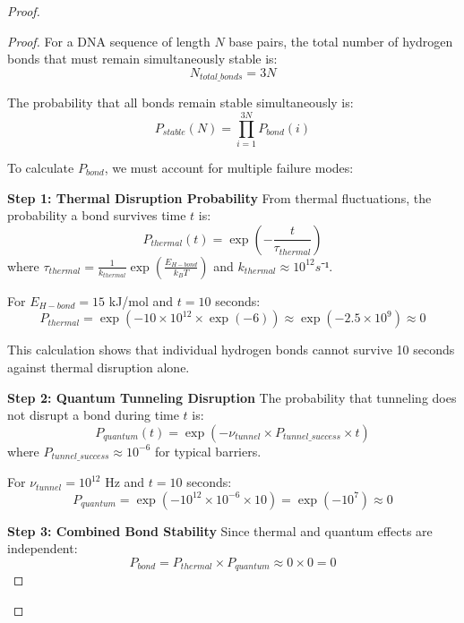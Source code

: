 \documentclass[12pt,a4paper]{article}
\begin{document}
\begin{proof}
\begin{proof}
For a DNA sequence of length $N$ base pairs, the total number of hydrogen bonds that must remain simultaneously stable is:
\begin{equation}
N_{total\_bonds} = 3N
\end{equation}

The probability that all bonds remain stable simultaneously is:
\begin{equation}
P_{stable}(N) = \prod_{i=1}^{3N} P_{bond}(i)
\end{equation}

To calculate $P_{bond}$, we must account for multiple failure modes:

\textbf{Step 1: Thermal Disruption Probability}
From thermal fluctuations, the probability a bond survives time $t$ is:
\begin{equation}
P_{thermal}(t) = \exp\left(-\frac{t}{\tau_{thermal}}\right)
\end{equation}
where $\tau_{thermal} = \frac{1}{k_{thermal}} \exp\left(\frac{E_{H-bond}}{k_BT}\right)$ and $k_{thermal} \approx 10^{12} s⁻¹.$

For $E_{H-bond} = 15$ kJ/mol and $t = 10$ seconds:
\begin{equation}
P_{thermal} = \exp\left(-10 \times 10^{12} \times \exp(-6)\right) \approx \exp(-2.5 \times 10^9) \approx 0
\end{equation}

This calculation shows that individual hydrogen bonds cannot survive 10 seconds against thermal disruption alone.

\textbf{Step 2: Quantum Tunneling Disruption}
The probability that tunneling does not disrupt a bond during time $t$ is:
\begin{equation}
P_{quantum}(t) = \exp(-\nu_{tunnel} \times P_{tunnel\_success} \times t)
\end{equation}
where $P_{tunnel\_success} \approx 10^{-6}$ for typical barriers.

For $\nu_{tunnel} = 10^{12}$ Hz and $t = 10$ seconds:
\begin{equation}
P_{quantum} = \exp(-10^{12} \times 10^{-6} \times 10) = \exp(-10^7) \approx 0
\end{equation}

\textbf{Step 3: Combined Bond Stability}
Since thermal and quantum effects are independent:
\begin{equation}
P_{bond} = P_{thermal} \times P_{quantum} \approx 0 \times 0 = 0
\end{equation}


\end{proof}
\end{proof}
\end{document}

